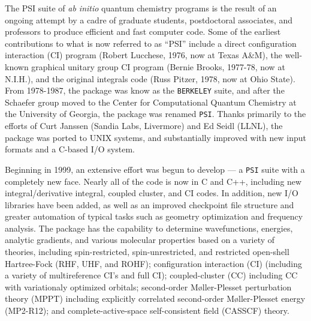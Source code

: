 %
%
%

The PSI suite of {\em ab initio} quantum chemistry programs is the result
of an ongoing attempt by a cadre of graduate students, postdoctoral
associates, and professors to produce efficient and fast computer code.
Some of the earliest contributions to what is now referred to as ``PSI''
include a direct configuration interaction (CI) program (Robert Lucchese,
1976, now at Texas A\&M), the well-known graphical unitary group CI program
(Bernie Brooks, 1977-78, now at N.I.H.), and the original integrals code
(Russ Pitzer, 1978, now at Ohio State).  From 1978-1987, the package was
know as the {\tt BERKELEY} suite, and after the Schaefer group moved to the
Center for Computational Quantum Chemistry at the University of Georgia,
the package was renamed {\tt PSI}.  Thanks primarily to the efforts of Curt
Janssen (Sandia Labs, Livermore) and Ed Seidl (LLNL), the package was
ported to UNIX systems, and substantially improved with new input formats
and a C-based I/O system.

Beginning in 1999, an extensive effort was begun to develop \PSIthree
--- a {\tt PSI} suite with a completely new face.  Nearly all of the
code is now in C and C++, including new integral/derivative integral,
coupled cluster, and CI codes.  In addition, new I/O libraries have
been added, as well as an improved checkpoint file structure and
greater automation of typical tasks such as geometry optimization and
frequency analysis.  The package has the capability to determine
wavefunctions, energies, analytic gradients, and various molecular
properties based on a variety of theories, including spin-restricted,
spin-unrestricted, and restricted open-shell Hartree-Fock (RHF, UHF,
and ROHF); configuration interaction (CI) (including a variety of
multireference CI's and full CI); coupled-cluster (CC) including CC
with variationaly optimized orbitals; second-order M{\o}ller-Plesset
perturbation theory (MPPT) including explicitly correlated
second-order M{\o}ller-Plesset energy (MP2-R12); and
complete-active-space self-consistent field (CASSCF) theory.

